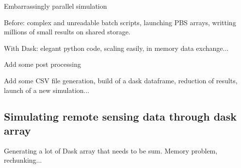 \documentclass{article}
\begin{document}
Embarrassingly parallel simulation

Before: complex and unreadable batch scripts, launching PBS arrays, writting millions of small results on shared storage.

With Dask: elegant python code, scaling easily, in memory data exchange...

Add some post processing

Add some CSV file generation, build of a dask dataframe, reduction of results, launch of a new simulation...

\subsection{Simulating remote sensing data through dask array}
\label{ssec:usecase2}

Generating a lot of Dask array that needs to be sum.
Memory problem, rechunking...


\vfill
\pagebreak






\small
\end{document}
